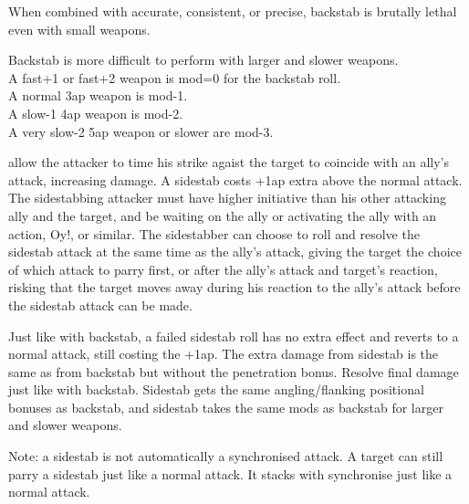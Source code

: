 When combined with accurate, consistent, or precise, backstab is brutally lethal even with small weapons.

Backstab is more difficult to perform with larger and slower weapons.\\
A fast+1 or fast+2 weapon is mod=0 for the backstab roll.\\
A normal 3ap weapon is mod-1.\\
A slow-1 4ap weapon is mod-2.\\
A very slow-2 5ap weapon or slower are mod-3.



 allow the attacker to time his strike agaist the target to coincide with an ally's attack, increasing damage. A sidestab costs +1ap extra above the normal attack. The sidestabbing attacker must have higher initiative than his other attacking ally and the target, and be waiting on the ally or activating the ally with an action, Oy!, or similar. The sidestabber can choose to roll and resolve the sidestab attack at the same time as the ally's attack, giving the target the choice of which attack to parry first, or after the ally's attack and target's reaction, risking that the target moves away during his reaction to the ally's attack before the sidestab attack can be made.

Just like with backstab, a failed sidestab roll has no extra effect and reverts to a normal attack, still costing the +1ap. The extra damage from sidestab is the same as from backstab but without the penetration bonus. Resolve final damage just like with backstab. Sidestab gets the same angling/flanking positional bonuses as backstab, and sidestab takes the same mods as backstab for larger and slower weapons.

Note: a sidestab is not automatically a synchronised attack. A target can still parry a sidestab just like a normal attack. It stacks with synchronise just like a normal attack.




